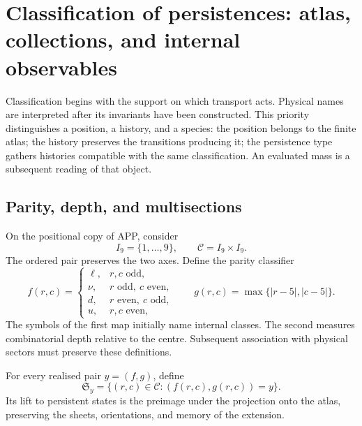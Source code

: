 \section{Classification of persistences: atlas, collections, and internal observables}
\label{vi:sec:atlas}

Classification begins with the support on which transport acts.
Physical names are interpreted after its invariants have been constructed.
This priority distinguishes a position, a history, and a species:
the position belongs to the finite atlas; the history preserves the transitions
producing it; the persistence type gathers histories compatible with the
same classification. An evaluated mass is a subsequent reading of that object.

\subsection{Parity, depth, and multisections}

On the positional copy of APP, consider
\[
 I_9=\{1,\ldots,9\},\qquad \mathcal C=I_9\times I_9.
\]
The ordered pair preserves the two axes. Define the parity classifier
\[
 f(r,c)=
 \begin{cases}
 \ell,&r,c\text{ odd},\\
 \nu,&r\text{ odd},\ c\text{ even},\\
 d,&r\text{ even},\ c\text{ odd},\\
 u,&r,c\text{ even},
 \end{cases}
 \qquad g(r,c)=\max\{|r-5|,|c-5|\}.
\]
The symbols of the first map initially name internal classes.
The second measures combinatorial depth relative to the centre. Subsequent
association with physical sectors must preserve these definitions.



\begin{definition}
For every realised pair \(y=(f,g)\), define
\[
 \mathfrak S_y=\{(r,c)\in\mathcal C:(f(r,c),g(r,c))=y\}.
\]
Its lift to persistent states is the preimage under the projection
onto the atlas, preserving the sheets, orientations, and memory of the extension.
\end{definition}

